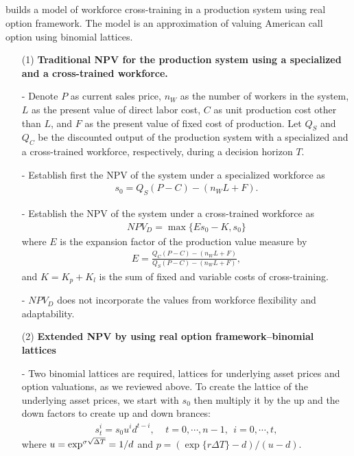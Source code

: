 \documentclass[11pt,letter]{article}
\def\D{\Delta} \def\G{\Gamma} \def\W{\Omega} \def\P{\Phi} \def\L{\Lambda} \def\Th{\Theta} \def\z{\zeta}
\theoremstyle{definition}
\theoremstyle{remark}
\numberwithin{equation}{section}
\begin{document}
\subsection{\cite{nembhard2005real}}
\cite{nembhard2005real} builds a model of workforce cross-training in a production system using real option framework. The model is an approximation of valuing American call option using binomial lattices.
\begin{itemize}
    \item[(1)] \textbf{Traditional NPV for the production system using a specialized and a cross-trained workforce.}
    
    \item[-] Denote $P$ as current sales price, $n_W$ as the number of workers in the system, $L$ as the present value of direct labor cost, $C$ as unit production cost other than $L$, and $F$ as the present value of fixed cost of production. Let $Q_S$ and $Q_C$ be the discounted output of the production system with a specialized and a cross-trained workforce, respectively, during a decision horizon $T$.
    
    \item[-] Establish first the NPV of the system under a specialized workforce as
        \begin{align*}
            s_0=Q_S(P-C)-(n_WL+F).
        \end{align*}
    
    \item[-] Establish the NPV of the system under a cross-trained workforce as
        \begin{align*}
            NPV_D=\max\{Es_0-K,s_0\}
        \end{align*}
    where $E$ is the expansion factor of the production value measure by
        \begin{align*}
            E=\frac{Q_C(P-C)-(n_WL+F)}{Q_S(P-C)-(n_WL+F)},
        \end{align*}
    and $K=K_p+K_l$ is the sum of fixed and variable costs of cross-training.
    
    \item[-] $NPV_D$ does not incorporate the values from workforce flexibility and adaptability.
    
    \item[(2)] \textbf{Extended NPV by using real option framework--binomial lattices}
    
    \item [-] Two binomial lattices are required, lattices for underlying asset prices and option valuations, as we reviewed above. To create the lattice of the underlying asset prices, we start with $s_0$ then multiply it by the up and the down factors to create up and down brances:
        \begin{align*}
            s_t^i=s_0u^id^{t-i},~~~~~t=0,\cdots,n-1,~~i=0,\cdots,t,
        \end{align*}
        where $u=\exp^{\s\sqrt{\D T}}=1/d$ and $p=(\exp\{r\D T\}-d)/(u-d)$. 
        

\end{itemize}
\end{document}
